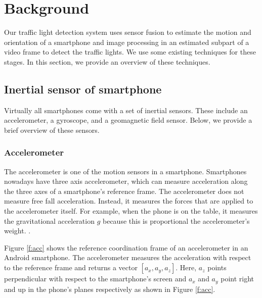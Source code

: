 \chapter{Background}
\label{c:background}
Our traffic light detection system uses sensor fusion to estimate the motion and orientation of a smartphone and image processing in an estimated subpart of a video frame to detect the traffic lights. 
We use some existing techniques for these stages. 
In this section, we provide an overview of these techniques. 


\section{Inertial sensor of smartphone}
Virtually all smartphones come with a set of inertial sensors. These include an accelerometer, a gyroscope, and a geomagnetic field sensor. 
Below, we provide a brief overview of these sensors. 


\subsection{Accelerometer}
The accelerometer is one of the motion sensors in a smartphone.
Smartphones nowadays have three axis accelerometer, which can measure acceleration along the three axes of a smartphone's reference frame.
The accelerometer does not measure free fall acceleration.
Instead, it measures the forces that are applied to the accelerometer itself.
For example, when the phone is on the table, it measures the gravitational acceleration $g$ because this is proportional the accelerometer's weight.
.

Figure \ref{f:acc} shows the reference coordination frame of an accelerometer in an Android smartphone.
The accelerometer measures the acceleration with respect to the reference frame and returns a vector $[a_x, a_y, a_z]$.
Here, $a_z$ points perpendicular with respect to the smartphone's screen and $a_x$ and $a_y$ point right and up in the phone's planes respectively as shown in Figure \ref{f:acc}.


